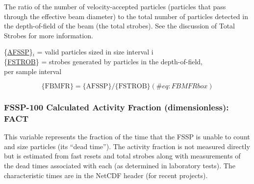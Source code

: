 \documentclass[
  english,
]{book}
\begin{document}
The ratio of the number of velocity-accepted particles (particles that
pass through the effective beam diameter) to the total number of
particles detected in the depth-of-field of the beam (the total
strobes). See the discussion of Total Strobes for more information.

\{\href{./5-cloud-physics-variables.html\#CRPC}{AFSSP}\}\(_{i}\) = valid
particles sized in size interval i\\
\{\protect\hyperlink{fstrob}{FSTROB}\} = strobes generated by particles
in the depth-of-field,\\
\hspace*{0.333em}\hspace*{0.333em}\hspace*{0.333em}\hspace*{0.333em}\hspace*{0.333em}\hspace*{0.333em}\hspace*{0.333em}\hspace*{0.333em}\hspace*{0.333em}\hspace*{0.333em}\hspace*{0.333em}\hspace*{0.333em}\hspace*{0.333em}\hspace*{0.333em}per
sample interval

\begin{equation}
\mathrm{\{FBMFR\}=\{AFSSP\}/\{FSTROB\}}
(\#eq:FBMFRbox)
\end{equation}

\hypertarget{fact}{%
\subsubsection*{FSSP-100 Calculated Activity Fraction (dimensionless):
FACT}\label{fact}}

This variable represents the fraction of the time that the FSSP is
unable to count and size particles (its ``dead time''). The activity
fraction is not measured directly but is estimated from fast resets and
total strobes along with measurements of the dead times associated with
each (as determined in laboratory tests). The characteristic times are
in the NetCDF header (for recent projects).
\end{document}

